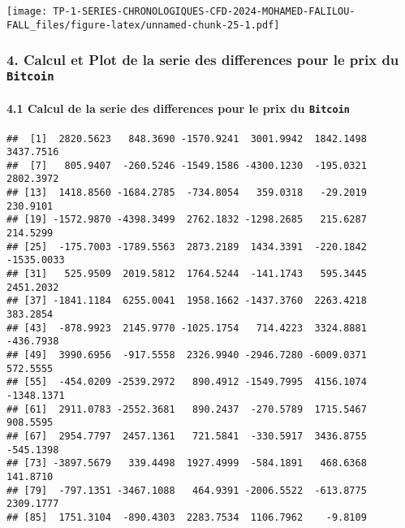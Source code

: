 \documentclass[
]{article}
\newenvironment{Shaded}{\begin{snugshade}}{\end{snugshade}}
\newcommand{\FunctionTok}[1]{\textcolor[rgb]{0.13,0.29,0.53}{\textbf{#1}}}
\newcommand{\NormalTok}[1]{#1}
\newcommand{\SpecialCharTok}[1]{\textcolor[rgb]{0.81,0.36,0.00}{\textbf{#1}}}
\begin{document}
\texttt{[image: TP-1-SERIES-CHRONOLOGIQUES-CFD-2024-MOHAMED-FALILOU-FALL\_files/figure-latex/unnamed-chunk-25-1.pdf]}

\subsubsection{\texorpdfstring{4. Calcul et Plot de la serie des
differences pour le prix du
\texttt{Bitcoin}}{4. Calcul et Plot de la serie des differences pour le prix du Bitcoin}}\label{calcul-et-plot-de-la-serie-des-differences-pour-le-prix-du-bitcoin}

\paragraph{\texorpdfstring{4.1 Calcul de la serie des differences pour
le prix du
\texttt{Bitcoin}}{4.1 Calcul de la serie des differences pour le prix du Bitcoin}}\label{calcul-de-la-serie-des-differences-pour-le-prix-du-bitcoin}

\begin{Shaded}
\end{Shaded}

\begin{verbatim}
##  [1]  2820.5623   848.3690 -1570.9241  3001.9942  1842.1498  3437.7516
##  [7]   805.9407  -260.5246 -1549.1586 -4300.1230  -195.0321  2802.3972
## [13]  1418.8560 -1684.2785  -734.8054   359.0318   -29.2019   230.9101
## [19] -1572.9870 -4398.3499  2762.1832 -1298.2685   215.6287   214.5299
## [25]  -175.7003 -1789.5563  2873.2189  1434.3391  -220.1842 -1535.0033
## [31]   525.9509  2019.5812  1764.5244  -141.1743   595.3445  2451.2032
## [37] -1841.1184  6255.0041  1958.1662 -1437.3760  2263.4218   383.2854
## [43]  -878.9923  2145.9770 -1025.1754   714.4223  3324.8881  -436.7938
## [49]  3990.6956  -917.5558  2326.9940 -2946.7280 -6009.0371   572.5555
## [55]  -454.0209 -2539.2972   890.4912 -1549.7995  4156.1074 -1348.1371
## [61]  2911.0783 -2552.3681   890.2437  -270.5789  1715.5467   908.5595
## [67]  2954.7797  2457.1361   721.5841  -330.5917  3436.8755  -545.1398
## [73] -3897.5679   339.4498  1927.4999  -584.1891   468.6368   141.8710
## [79]  -797.1351 -3467.1088   464.9391 -2006.5522  -613.8775  2309.1777
## [85]  1751.3104  -890.4303  2283.7534  1106.7962    -9.8109
\end{verbatim}
\end{document}
